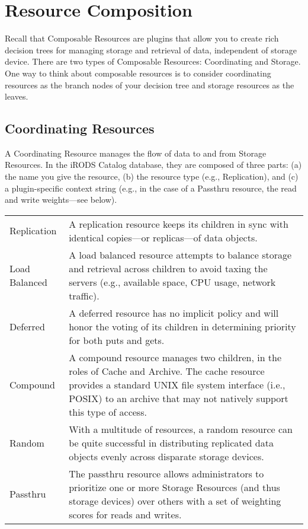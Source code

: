 \documentclass[10pt,oneside]{memoir}
\begin{document}
\section{Resource Composition}

Recall that Composable Resources are plugins that allow you to create rich decision trees for managing storage and retrieval of data, independent of storage device.  There are two types of Composable Resources: Coordinating and Storage. One way to think about composable resources is to consider coordinating resources as the branch nodes of your decision tree and storage resources as the leaves.

\subsection{Coordinating Resources}
\label{sec:coordinating_resources}

A Coordinating Resource manages the flow of data to and from Storage Resources. In the iRODS Catalog database, they are composed of three parts: (a) the name you give the resource, (b) the resource type (e.g., Replication), and (c) a plugin-specific context string (e.g., in the case of a Passthru resource, the read and write weights---see below).

\begin{center}
\def\arraystretch{1.5}%
\begin{tabular}{ |l|p{10cm}| }
\hline
Replication & A replication resource keeps its children in sync with identical copies---or replicas---of data objects. \\
Load Balanced & A load balanced resource attempts to balance storage and retrieval across children to avoid taxing the servers (e.g., available space, CPU usage, network traffic). \\
Deferred & A deferred resource has no implicit policy and will honor the voting of its children in determining priority for both puts and gets. \\
Compound & A compound resource manages two children, in the roles of Cache and Archive. The cache resource provides a standard UNIX file system interface (i.e., POSIX) to an archive that may not natively support this type of access. \\
Random & With a multitude of resources, a random resource can be quite successful in distributing replicated data objects evenly across disparate storage devices. \\
Passthru & The passthru resource allows administrators to prioritize one or more Storage Resources (and thus storage devices) over others with a set of weighting scores for reads and writes. \\
\hline
\end{tabular}
\end{center}
\end{document}
